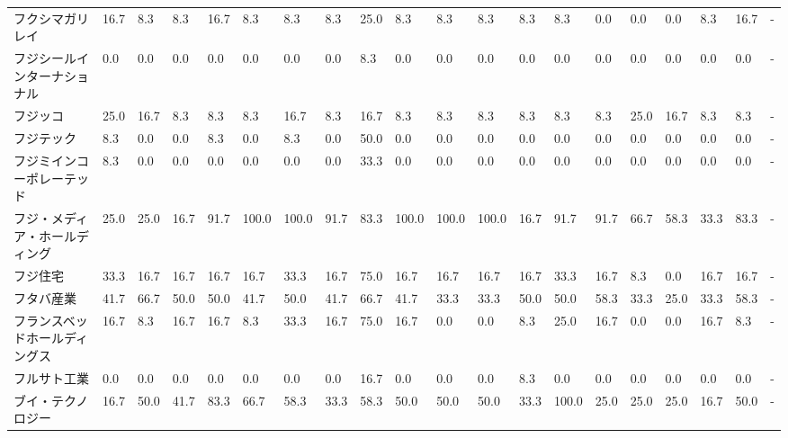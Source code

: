 \begin{tabular}{llllllllllllllllllll}
フクシマガリレイ        &   16.7 &    8.3 &       8.3 &      16.7 &        8.3 &    8.3 &    8.3 &   25.0 &     8.3 &     8.3 &    8.3 &   8.3 &    8.3 &     0.0 &     0.0 &   0.0 &   8.3 &  16.7 &     - \\
フジシールインターナショナル  &    0.0 &    0.0 &       0.0 &       0.0 &        0.0 &    0.0 &    0.0 &    8.3 &     0.0 &     0.0 &    0.0 &   0.0 &    0.0 &     0.0 &     0.0 &   0.0 &   0.0 &   0.0 &     - \\
フジッコ            &   25.0 &   16.7 &       8.3 &       8.3 &        8.3 &   16.7 &    8.3 &   16.7 &     8.3 &     8.3 &    8.3 &   8.3 &    8.3 &     8.3 &    25.0 &  16.7 &   8.3 &   8.3 &     - \\
フジテック           &    8.3 &    0.0 &       0.0 &       8.3 &        0.0 &    8.3 &    0.0 &   50.0 &     0.0 &     0.0 &    0.0 &   0.0 &    0.0 &     0.0 &     0.0 &   0.0 &   0.0 &   0.0 &     - \\
フジミインコーポレーテッド   &    8.3 &    0.0 &       0.0 &       0.0 &        0.0 &    0.0 &    0.0 &   33.3 &     0.0 &     0.0 &    0.0 &   0.0 &    0.0 &     0.0 &     0.0 &   0.0 &   0.0 &   0.0 &     - \\
フジ・メディア・ホールディング &   25.0 &   25.0 &      16.7 &      91.7 &      100.0 &  100.0 &   91.7 &   83.3 &   100.0 &   100.0 &  100.0 &  16.7 &   91.7 &    91.7 &    66.7 &  58.3 &  33.3 &  83.3 &     - \\
フジ住宅            &   33.3 &   16.7 &      16.7 &      16.7 &       16.7 &   33.3 &   16.7 &   75.0 &    16.7 &    16.7 &   16.7 &  16.7 &   33.3 &    16.7 &     8.3 &   0.0 &  16.7 &  16.7 &     - \\
フタバ産業           &   41.7 &   66.7 &      50.0 &      50.0 &       41.7 &   50.0 &   41.7 &   66.7 &    41.7 &    33.3 &   33.3 &  50.0 &   50.0 &    58.3 &    33.3 &  25.0 &  33.3 &  58.3 &     - \\
フランスベッドホールディングス &   16.7 &    8.3 &      16.7 &      16.7 &        8.3 &   33.3 &   16.7 &   75.0 &    16.7 &     0.0 &    0.0 &   8.3 &   25.0 &    16.7 &     0.0 &   0.0 &  16.7 &   8.3 &     - \\
フルサト工業          &    0.0 &    0.0 &       0.0 &       0.0 &        0.0 &    0.0 &    0.0 &   16.7 &     0.0 &     0.0 &    0.0 &   8.3 &    0.0 &     0.0 &     0.0 &   0.0 &   0.0 &   0.0 &     - \\
ブイ・テクノロジー       &   16.7 &   50.0 &      41.7 &      83.3 &       66.7 &   58.3 &   33.3 &   58.3 &    50.0 &    50.0 &   50.0 &  33.3 &  100.0 &    25.0 &    25.0 &  25.0 &  16.7 &  50.0 &     - \\

\end{tabular}
